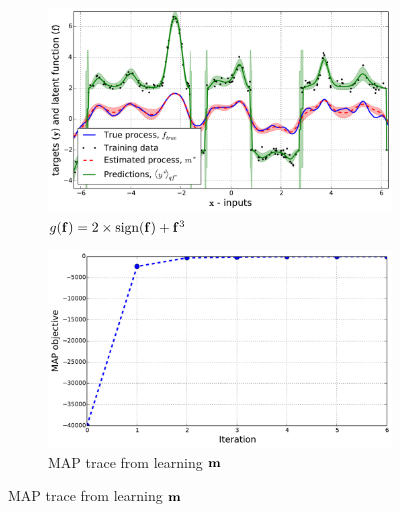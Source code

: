 \documentclass{article} %
\begin{document}
%
\begin{figure}[tb]
    \begin{subfigure}[b]{0.5\linewidth}
        \includegraphics[width=\linewidth]{fig/signdemo}
        \caption{$g\!\left({{\mathbf{f}}}\right) = 2\times\text{sign}\!\left({\mathbf{f}}\right)
            + \mathbf{f}^3$}
        \label{sub:sign}
    \end{subfigure}
    \begin{subfigure}[b]{0.5\linewidth}
        \includegraphics[width=\linewidth]{fig/trace_end}
        \caption{MAP trace from learning $\mathbf{m}$}
        \label{sub:mape}
        \vspace{1.5mm}
    \end{subfigure}


\end{figure}
\end{document}

